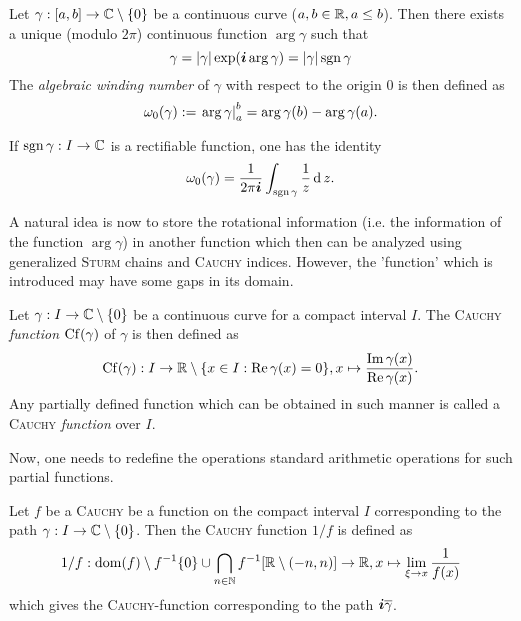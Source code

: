 \documentclass[10pt,a4paper]{article}
\begin{document}
\begin{definition}
Let $\gamma:[a,b]\rightarrow\mathbb{C}\setminus\{0\}$ be a continuous curve ($a,b\in\mathbb{R},a\leq b$). Then there exists a unique (modulo $2\pi$) continuous function $\arg{\gamma}$ such that 
\begin{equation}
\gamma = \left|\gamma\right|\exp(\boldsymbol{i}\arg{\gamma}) = \left|\gamma\right|\operatorname{sgn}{\gamma}
\end{equation}
The \emph{algebraic winding number} of $\gamma$ with respect to the origin 0 is then defined as
\begin{equation}
\omega_0(\gamma) := \left. \arg{\gamma}\right\vert^b_a = \arg{\gamma(b)}-\arg{\gamma(a)}\text{.}
\end{equation}

\end{definition}

\begin{remark}
If $\operatorname{sgn}{\gamma}:I\rightarrow\mathbb{C}$ is a rectifiable function, one has the identity
\begin{equation}
\omega_0(\gamma)=\frac{1}{2\pi\boldsymbol{i}}\int_{\operatorname{sgn}{\gamma}}{\frac{1}{z}}\operatorname{d}{z}\text{.}
\end{equation}
\end{remark}

A natural idea is now to store the rotational information (i.e. the information of the function $\arg{\gamma}$) in another function which then can be analyzed using generalized \textsc{Sturm} chains and \textsc{Cauchy} indices. However, the 'function' which is introduced may have some gaps in its domain.

\begin{definition} Let $\gamma:I\rightarrow\mathbb{C}\setminus\{0\}$ be a continuous curve for a compact interval $I$. The \textsc{Cauchy} \emph{function} $\operatorname{Cf}(\gamma)$ of $\gamma$ is then defined as
\begin{equation}
\operatorname{Cf}(\gamma):I\rightarrow\mathbb{R}\setminus\{x\in I:\operatorname{Re}{\gamma(x)}=0\},x\mapsto\frac{\operatorname{Im}{\gamma(x)}}{\operatorname{Re}{\gamma(x)}}\text{.}
\end{equation}
Any partially defined function which can be obtained in such manner is called a \textsc{Cauchy} \emph{function} over $I$.
\end{definition}


Now, one needs to redefine the operations standard arithmetic operations for such partial functions.

\begin{definition}
Let $f$ be a \textsc{Cauchy} be a function on the compact interval $I$ corresponding to the path $\gamma:I\rightarrow\mathbb{C}\setminus\{0\}$. Then the \textsc{Cauchy} function $1/f$ is defined as
\begin{equation}
1/f:\operatorname{dom}(f)\setminus f^{-1}\{0\}\cup \bigcap_{n\in\mathbb{N}}f^{-1}[\mathbb{R}\setminus (-n,n)]\rightarrow\mathbb{R},x\mapsto\lim_{\xi\rightarrow x}{\frac{1}{f(x)}}
\end{equation}
which gives the \textsc{Cauchy}-function corresponding to the path $\boldsymbol{i}\overline{\gamma}$.
\end{definition}
\end{document}
